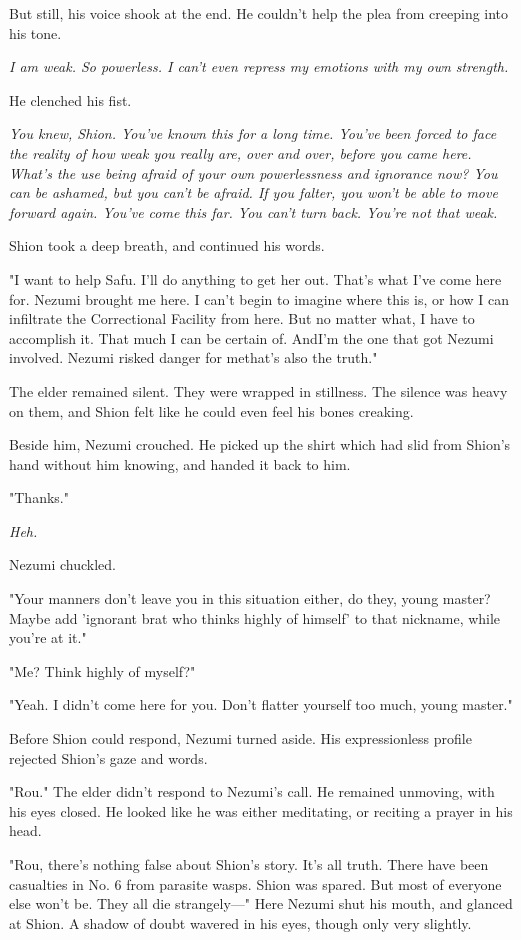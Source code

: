 But still, his voice shook at the end. He couldn't help the plea from
creeping into his tone.

\emph{I am weak. So powerless. I can't even repress my emotions with my own
strength.}

He clenched his fist.

\emph{You knew, Shion. You've known this for a long time. You've been forced
to face the reality of how weak you really are, over and over, before
you came here. What's the use being afraid of your own powerlessness and
ignorance \emph{now}? You can be ashamed, but you can't be afraid. If you
falter, you won't be able to move forward again. You've come this far.
You can't turn back. You're not that weak.}

Shion took a deep breath, and continued his words.

"I want to help Safu. I'll do anything to get her out. That's what I've
come here for. Nezumi brought me here. I can't begin to imagine where
this is, or how I can infiltrate the Correctional Facility from here.
But no matter what, I have to accomplish it. That much I can be certain
of. And\el I'm the one that got Nezumi involved. Nezumi risked danger
for me\el that's also the truth."

The elder remained silent. They were wrapped in stillness. The silence
was heavy on them, and Shion felt like he could even feel his bones
creaking.

Beside him, Nezumi crouched. He picked up the shirt which had slid from
Shion's hand without him knowing, and handed it back to him.

"Thanks."

\emph{Heh.}

Nezumi chuckled.

"Your manners don't leave you in this situation either, do they, young
master? Maybe add 'ignorant brat who thinks highly of himself' to that
nickname, while you're at it."

"Me? Think highly of myself?"

"Yeah. I didn't come here for you. Don't flatter yourself too much,
young master."

Before Shion could respond, Nezumi turned aside. His expressionless
profile rejected Shion's gaze and words.

"Rou." The elder didn't respond to Nezumi's call. He remained unmoving,
with his eyes closed. He looked like he was either meditating, or
reciting a prayer in his head.

"Rou, there's nothing false about Shion's story. It's all truth. There
have been casualties in No. 6 from parasite wasps. Shion was spared. But
most of everyone else won't be. They all die strangely---" Here Nezumi
shut his mouth, and glanced at Shion. A shadow of doubt wavered in his
eyes, though only very slightly.

